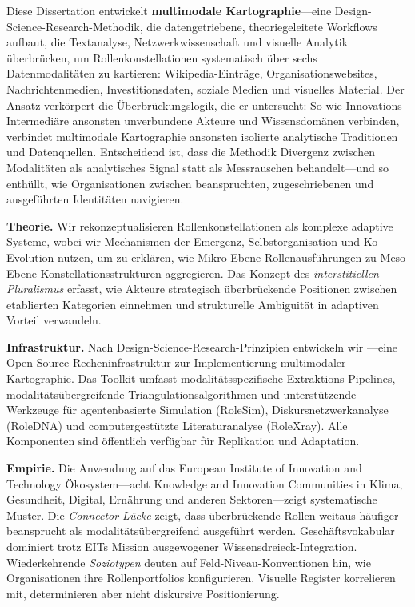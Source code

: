 \documentclass[../main.tex]{subfiles}
\begin{document}
Diese Dissertation entwickelt \textbf{multimodale Kartographie}---eine Design-Science-Research-Methodik, die datengetriebene, theoriegeleitete Workflows aufbaut, die Textanalyse, Netzwerkwissenschaft und visuelle Analytik überbrücken, um Rollenkonstellationen systematisch über sechs Datenmodalitäten zu kartieren: Wikipedia-Einträge, Organisationswebsites, Nachrichtenmedien, Investitionsdaten, soziale Medien und visuelles Material. Der Ansatz verkörpert die Überbrückungslogik, die er untersucht: So wie Innovations-Intermediäre ansonsten unverbundene Akteure und Wissensdomänen verbinden, verbindet multimodale Kartographie ansonsten isolierte analytische Traditionen und Datenquellen. Entscheidend ist, dass die Methodik Divergenz zwischen Modalitäten als analytisches Signal statt als Messrauschen behandelt---und so enthüllt, wie Organisationen zwischen beanspruchten, zugeschriebenen und ausgeführten Identitäten navigieren.

\textbf{Theorie.} Wir rekonzeptualisieren Rollenkonstellationen als komplexe adaptive Systeme, wobei wir Mechanismen der Emergenz, Selbstorganisation und Ko-Evolution nutzen, um zu erklären, wie Mikro-Ebene-Rollenausführungen zu Meso-Ebene-Konstellationsstrukturen aggregieren. Das Konzept des \textit{interstitiellen Pluralismus} erfasst, wie Akteure strategisch überbrückende Positionen zwischen etablierten Kategorien einnehmen und strukturelle Ambiguität in adaptiven Vorteil verwandeln.

\textbf{Infrastruktur.} Nach Design-Science-Research-Prinzipien entwickeln wir \RoleBox---eine Open-Source-Recheninfrastruktur zur Implementierung multimodaler Kartographie. Das Toolkit umfasst modalitätsspezifische Extraktions-Pipelines, modalitätsübergreifende Triangulationsalgorithmen und unterstützende Werkzeuge für agentenbasierte Simulation (RoleSim), Diskursnetzwerkanalyse (RoleDNA) und computergestützte Literaturanalyse (RoleXray). Alle Komponenten sind öffentlich verfügbar für Replikation und Adaptation.

\textbf{Empirie.} Die Anwendung auf das European Institute of Innovation and Technology Ökosystem---acht Knowledge and Innovation Communities in Klima, Gesundheit, Digital, Ernährung und anderen Sektoren---zeigt systematische Muster. Die \textit{Connector-Lücke} zeigt, dass überbrückende Rollen weitaus häufiger beansprucht als modalitätsübergreifend ausgeführt werden. Geschäftsvokabular dominiert trotz EITs Mission ausgewogener Wissensdreieck-Integration. Wiederkehrende \textit{Soziotypen} deuten auf Feld-Niveau-Konventionen hin, wie Organisationen ihre Rollenportfolios konfigurieren. Visuelle Register korrelieren mit, determinieren aber nicht diskursive Positionierung.
\end{document}

